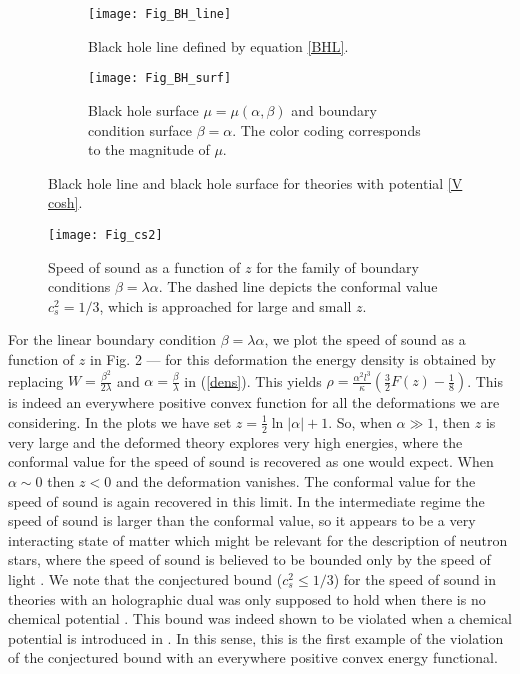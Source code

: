 \documentclass[11pt,epsf,letterpaper]{article}%
\begin{document}
\begin{figure}[th]
\centering
\begin{subfigure}{0.4\linewidth}
\texttt{[image: Fig\_BH\_line]}
\caption{\label{fig1} Black hole line defined by equation \eqref{BHL}.}
\end{subfigure} \qquad\qquad\begin{subfigure}{0.4\linewidth}
\texttt{[image: Fig\_BH\_surf]}
\caption{\label{fig2} Black hole surface $\mu = \mu(\alpha, \beta)$ and boundary condition surface $\beta = \alpha$.
The color coding corresponds to the magnitude of $\mu$.}
\end{subfigure}
\caption{Black hole line and black hole surface for theories with potential
\eqref{V cosh}.}%
\end{figure}

\begin{figure}[th]
\label{fig:cs2}\centering
\texttt{[image: Fig\_cs2]}\caption{Speed of sound as a
function of $z$ for the family of boundary conditions $\beta=\lambda\alpha$.
The dashed line depicts the conformal value $c_{s}^{2}=1/3$, which is
approached for large and small $z$.}%
\end{figure}For the linear boundary condition $\beta=\lambda\alpha$, we plot
the speed of sound as a function of $z$ in Fig. 2 --- for this deformation the
energy density is obtained by replacing $W=\frac{\beta^{2}}{2\lambda}$ and
$\alpha=\frac{\beta}{\lambda}$ in (\ref{dens}). This yields $\rho=\frac
{\alpha^{2}l^{3}}{\kappa}\left(  \frac{3}{2}F(z)-\frac{1}{8}\right)  $. This
is indeed an everywhere positive convex function for all the deformations we
are considering. In the plots we have set $z=\frac{1}{2}\ln\left\vert
\alpha\right\vert +1$. So, when $\alpha\gg1$, then $z$ is very large and the
deformed theory explores very high energies, where the conformal value for the
speed of sound is recovered as one would expect. When $\alpha\sim0$ then $z<0$
and the deformation vanishes. The conformal value for the speed of sound is
again recovered in this limit. In the intermediate regime the speed of sound
is larger than the conformal value, so it appears to be a very interacting
state of matter which might be relevant for the description of neutron stars,
where the speed of sound is believed to be bounded only by the speed of light
\cite{Rhoades:1974fn}. We note that the conjectured bound ($c_{s}^{2}\leq1/3$)
for the speed of sound in theories with an holographic dual was only supposed
to hold when there is no chemical potential \cite{Cherman:2009tw}. This bound
was indeed shown to be violated when a chemical potential is introduced in
\cite{Hoyos:2016cob}. In this sense, this is the first example of the
violation of the conjectured bound with an everywhere positive convex energy functional.
\end{document}
